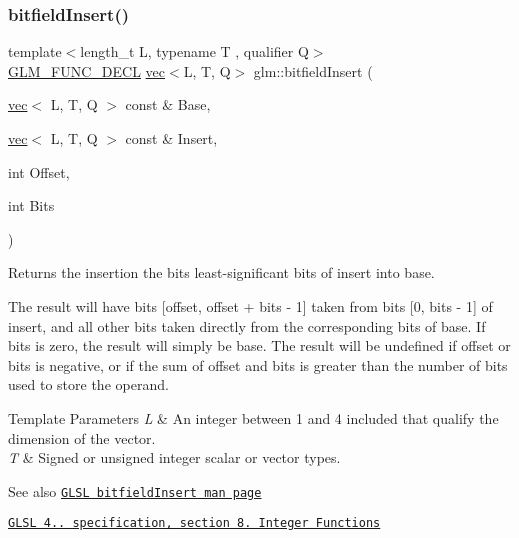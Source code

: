 \subsubsection{\texorpdfstring{bitfield\+Insert()}{bitfieldInsert()}}
{\footnotesize\ttfamily template$<$length\+\_\+t L, typename T , qualifier Q$>$ \\
\hyperlink{setup_8hpp_ab2d052de21a70539923e9bcbf6e83a51}{G\+L\+M\+\_\+\+F\+U\+N\+C\+\_\+\+D\+E\+CL} \hyperlink{structglm_1_1vec}{vec}$<$L, T, Q$>$ glm\+::bitfield\+Insert (\begin{DoxyParamCaption}\item[{\hyperlink{structglm_1_1vec}{vec}$<$ L, T, Q $>$ const \&}]{Base,  }\item[{\hyperlink{structglm_1_1vec}{vec}$<$ L, T, Q $>$ const \&}]{Insert,  }\item[{int}]{Offset,  }\item[{int}]{Bits }\end{DoxyParamCaption})}

Returns the insertion the bits least-\/significant bits of insert into base.

The result will have bits \mbox{[}offset, offset + bits -\/ 1\mbox{]} taken from bits \mbox{[}0, bits -\/ 1\mbox{]} of insert, and all other bits taken directly from the corresponding bits of base. If bits is zero, the result will simply be base. The result will be undefined if offset or bits is negative, or if the sum of offset and bits is greater than the number of bits used to store the operand.


\begin{DoxyTemplParams}{Template Parameters}
{\em L} & An integer between 1 and 4 included that qualify the dimension of the vector. \\
\hline
{\em T} & Signed or unsigned integer scalar or vector types.\\
\hline
\end{DoxyTemplParams}
\begin{DoxySeeAlso}{See also}
\href{http://www.opengl.org/sdk/docs/manglsl/xhtml/bitfieldInsert.xml}{\tt G\+L\+SL bitfield\+Insert man page} 

\href{http://www.opengl.org/registry/doc/GLSLangSpec.4.20.8.pdf}{\tt G\+L\+SL 4.. specification, section 8. Integer Functions} 
\end{DoxySeeAlso}
\mbox{\label{group__core__func__integer_ga750a1d92464489b7711dee67aa3441b6}} 
